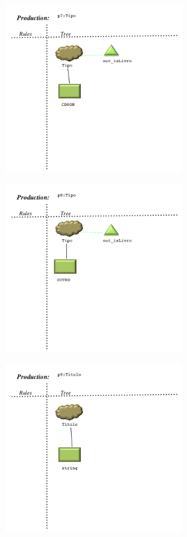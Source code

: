 \begin{figure}[!htb]
  \centering
    \includegraphics[width=0.7\textwidth]{./imagens/VisualLisa/__p7_Tipo.png}
\end{figure}
\begin{figure}[!htb]
  \centering
    \includegraphics[width=0.7\textwidth]{./imagens/VisualLisa/__p8_Tipo.png}
\end{figure}
\begin{figure}[!htb]
  \centering
    \includegraphics[width=0.7\textwidth]{./imagens/VisualLisa/__p9_Titulo.png}
\end{figure}
